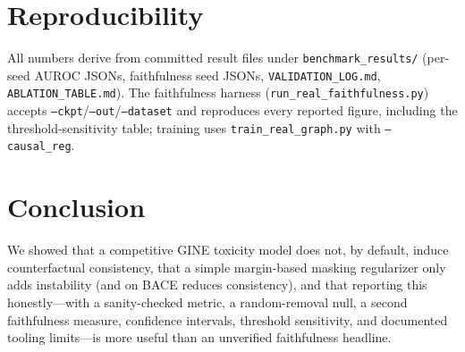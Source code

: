 \documentclass[a4paper,fleqn]{cas-dc}
\begin{document}
\section{Reproducibility}
All numbers derive from committed result files under \texttt{benchmark\_results/} (per-seed AUROC JSONs, faithfulness seed JSONs, \texttt{VALIDATION\_LOG.md}, \texttt{ABLATION\_TABLE.md}). The faithfulness harness (\texttt{run\_real\_faithfulness.py}) accepts \texttt{--ckpt}/\texttt{--out}/\texttt{--dataset} and reproduces every reported figure, including the threshold-sensitivity table; training uses \texttt{train\_real\_graph.py} with \texttt{--causal\_reg}.

\section{Conclusion}
We showed that a competitive GINE toxicity model does not, by default, induce counterfactual consistency, that a simple margin-based masking regularizer only adds instability (and on BACE reduces consistency), and that reporting this honestly---with a sanity-checked metric, a random-removal null, a second faithfulness measure, confidence intervals, threshold sensitivity, and documented tooling limits---is more useful than an unverified faithfulness headline.



\end{document}
